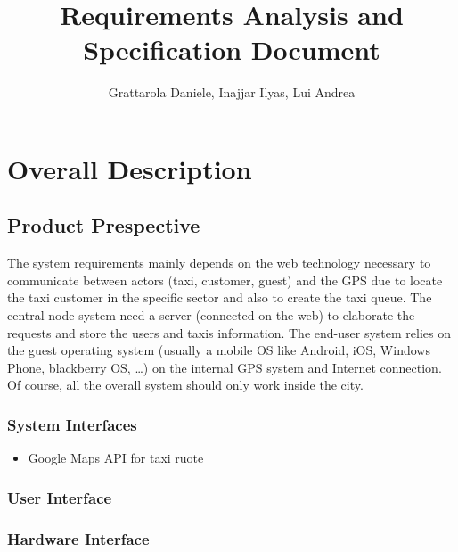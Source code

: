 \documentclass[english]{article}
\begin{document}
\title{Requirements Analysis and Specification Document\pagebreak{}}

\author{
	Grattarola Daniele, Inajjar Ilyas, Lui Andrea
}

\maketitle

\tableofcontents{}

\pagebreak{}

\section{Overall Description}

\subsection{Product Prespective}

The system requirements mainly depends on the web technology necessary to communicate between actors 
(taxi, customer, guest) and the GPS due to locate the taxi customer in the specific sector and also to create the taxi queue. 
The central node system need a server (connected on the web) to elaborate the requests and store the users and taxis information. 
The end-user system relies on the guest operating system (usually a mobile OS like Android, iOS, Windows Phone, blackberry OS, \ldots) 
on the internal GPS system and Internet connection. Of course, all the overall system should only work inside the city.

\subsubsection{System Interfaces}

\begin{itemize}
	\item Google Maps API for taxi ruote
\end{itemize}

\subsubsection{User Interface}


\subsubsection{Hardware Interface}
\end{document}

